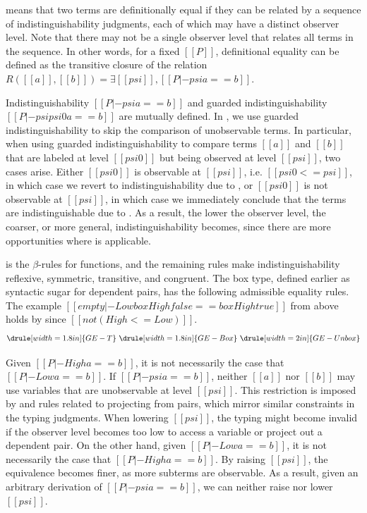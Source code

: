 \documentclass[acmsmall]{acmart}
\newcommand{\scw}[1]{}
\begin{document}
 means that two terms are definitionally equal if they can be related by a
sequence of indistinguishability judgments, each of which may have a
distinct observer level. Note that there may not be a single observer level that relates all terms in the sequence.
In other words, for a fixed $[[P]]$, definitional equality can be defined as the transitive
closure of the relation $ R([[a]],[[b]])=\exists [[psi]], [[P |- psi a == b]]$. 
\scw{Can delete last sentence if we need space}

Indistinguishability $[[P |- psi a == b]]$ and guarded indistinguishability
$[[P |- psi psi0 a == b]]$ are mutually defined. 
In ,
we use guarded indistinguishability to skip the comparison of
unobservable terms.
In particular, when using guarded indistinguishability to compare terms $[[a]]$ and $[[b]]$ that
are labeled at level $[[psi0]]$ but being observed at level $[[psi]]$, two cases
arise. Either $[[psi0]]$ is observable at $[[psi]]$, i.e. $[[psi0 <= psi]]$,
in which case we revert to indistinguishability due to , or $[[psi0]]$ is not
observable at $[[psi]]$, in which case we immediately conclude that the terms
are indistinguishable due to . As a result, the lower the
observer level, the coarser, or more general, indistinguishability becomes, since there are more
opportunities where  is applicable.

 is the $\beta$-rules for functions,
and the remaining rules make indistinguishability reflexive, symmetric, transitive, and congruent.
The box type, defined earlier as syntactic sugar for dependent pairs,
has the following admissible equality rules.
The example
$[[empty |- Low box High false == box High true]]$ from above
holds by  since $[[not (High <= Low)]]$.
%
\[ \drule[width=1.8in]{GE-T} \ \drule[width=1.8in]{GE-Box} \ \drule[width=2in]{GE-Unbox}
\]

Given $[[P |- High a == b]]$,
it is not necessarily the case that $[[P |- Low a == b]]$.
If $[[P |- psi a == b]]$, neither $[[a]]$ nor $[[b]]$ may use variables
that are unobservable at level $[[psi]]$. This restriction is
imposed by  and rules related to projecting from pairs, which mirror similar 
constraints in the typing judgments.
When lowering $[[psi]]$, the typing might become invalid if the
observer level becomes too low to access a variable or project
out a dependent pair.
On the other hand, 
given $[[P |- Low a == b]]$, it is not necessarily the case that 
$[[P |- High a == b]]$. By raising $[[psi]]$, the equivalence becomes
finer, as more subterms are observable.
As a result,
given an arbitrary derivation of $[[P |- psi a == b]]$, we can neither
raise nor lower $[[psi]]$. 
\end{document}

